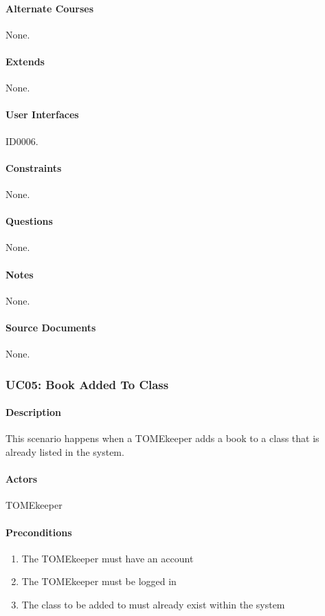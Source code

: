 \documentclass[12pt,titlepage]{article}
\begin{document}
\paragraph{Alternate Courses}
None.
\paragraph{Extends}
None.
\paragraph{User Interfaces}
ID0006.
\paragraph{Constraints}
None.
\paragraph{Questions}
None.
\paragraph{Notes}
None.
\paragraph{Source Documents}
None.

\subsubsection{UC05: Book Added To Class}
\paragraph{Description}
This scenario happens when a TOMEkeeper adds a book to a class that is already listed in the system.
\paragraph{Actors}
TOMEkeeper
\paragraph{Preconditions}
\begin{enumerate}
	\item The TOMEkeeper must have an account
	\item The TOMEkeeper must be logged in
	\item The class to be added to must already exist within the system
\end{enumerate}
\end{document}
